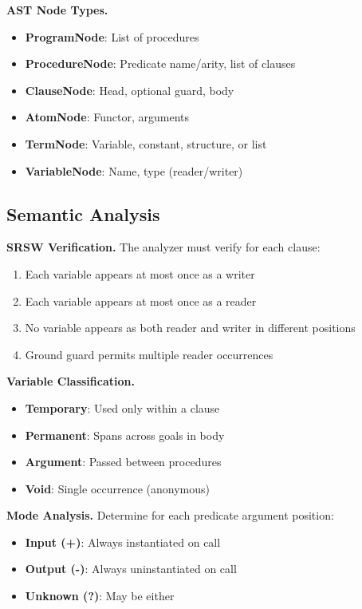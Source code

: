 \documentclass[runningheads,thm-restate]{llncs}
\newcommand{\mypara}[1]{\smallskip\noindent\textbf{#1.}}
\begin{document}
\mypara{AST Node Types}
\begin{itemize}
\item \textbf{ProgramNode}: List of procedures
\item \textbf{ProcedureNode}: Predicate name/arity, list of clauses
\item \textbf{ClauseNode}: Head, optional guard, body
\item \textbf{AtomNode}: Functor, arguments
\item \textbf{TermNode}: Variable, constant, structure, or list
\item \textbf{VariableNode}: Name, type (reader/writer)
\end{itemize}

\subsection{Semantic Analysis}

\mypara{SRSW Verification}
The analyzer must verify for each clause:
\begin{enumerate}
\item Each variable appears at most once as a writer
\item Each variable appears at most once as a reader
\item No variable appears as both reader and writer in different positions
\item Ground guard permits multiple reader occurrences
\end{enumerate}

\mypara{Variable Classification}
\begin{itemize}
\item \textbf{Temporary}: Used only within a clause
\item \textbf{Permanent}: Spans across goals in body
\item \textbf{Argument}: Passed between procedures
\item \textbf{Void}: Single occurrence (anonymous)
\end{itemize}

\mypara{Mode Analysis}
Determine for each predicate argument position:
\begin{itemize}
\item \textbf{Input (+)}: Always instantiated on call
\item \textbf{Output (-)}: Always uninstantiated on call
\item \textbf{Unknown (?)}: May be either
\end{itemize}
\end{document}
